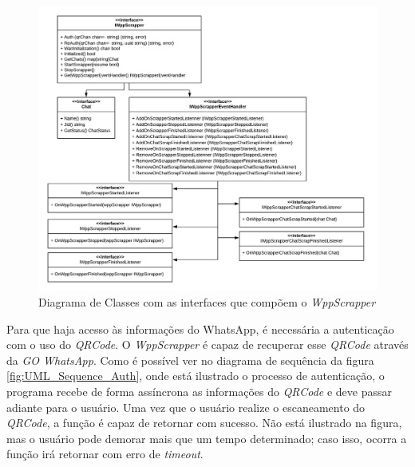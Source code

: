 \begin{figure}[!htb]
    \includegraphics[width=\textwidth]{img/WppScrapperInterface.png}
    \caption{Diagrama de Classes com as interfaces que compõem o \textit{WppScrapper}}
    \centering
    \label{fig:WppScrapperInterfaces}
\end{figure}
Para que haja acesso às informações do WhatsApp, é necessária a autenticação com o uso do \textit{QRCode}. O \textit{WppScrapper} é capaz de recuperar esse \textit{QRCode} através da \textit{GO WhatsApp}. Como é possível ver no diagrama de sequência da figura \ref{fig:UML_Sequence_Auth}, onde está ilustrado o processo de autenticação, o programa recebe de forma assíncrona as informações do \textit{QRCode} e deve passar adiante para o usuário. Uma vez que o usuário realize o escaneamento do \textit{QRCode}, a função é capaz de retornar com sucesso. Não está ilustrado na figura, mas o usuário pode demorar mais que um tempo determinado; caso isso, ocorra a função irá retornar com erro de \textit{timeout}.


